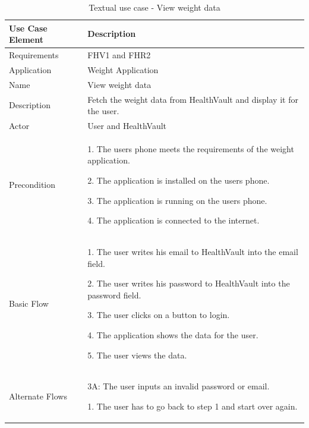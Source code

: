 \begin{table}[h]
\begin{center}
\begin{tabular}{ l | p{10cm} }
  \hline
  \textbf{Use Case Element} & \textbf{Description} \\ \hline\hline
  Requirements & FHV1 and FHR2\\ \hline
  Application & Weight Application \\ \hline
  Name & View weight data \\ \hline
  Description & Fetch the weight data from HealthVault and display it for the user. \\ \hline
  Actor & User and HealthVault \\ \hline
  Precondition &
    \par 1. The users phone meets the requirements of the weight application.
  	\par 2. The application is installed on the users phone.
  	\par 3. The application is running on the users phone.
  	\par 4. The application is connected to the internet.
  \\ \hline
  Basic Flow & 
  	\par 1. The user writes his email to HealthVault into the email field.
  	\par 2. The user writes his password to HealthVault into the password field.
  	\par 3. The user clicks on a button to login.
  	\par 4. The application shows the data for the user.
  	\par 5. The user views the data.
  \\ \hline
  Alternate Flows & 
  	\par 3A: The user inputs an invalid password or email.
  	\par\hspace{15pt} 1. The user has to go back to step 1 and start over again.
  \\ \hline
\end{tabular}
\end{center}
\caption{Textual use case - View weight data}
\label{table:use-case-view-weight-data}
\end{table}

